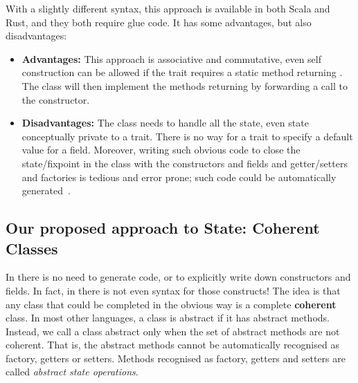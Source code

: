 \noindent 

With a slightly different syntax, this approach is available in both Scala and Rust, and they both require glue code.
It has some advantages, but also disadvantages: 

\begin{itemize}

\item {\bf Advantages:} This approach is associative and commutative, even self construction
  can be allowed if the trait requires a static method
  returning \Q@This@. The class will then implement the methods returning \Q@This@
  by forwarding a call to the constructor.
  
\item {\bf Disadvantages:}
The class needs to handle all the state, even state conceptually
   private to a trait. 
 There is no way for a trait to specify a default value for a field.
 Moreover, writing such obvious code to close
  the state/fixpoint in the class 
   with the constructors and fields and getter/setters and factories is tedious and error prone; such code could be automatically
   generated~\cite{wang2016classless}.
\end{itemize}

\subsection{Our proposed approach to State: Coherent Classes}

In \name there is no need to generate
code, or to explicitly write down constructors and fields. In fact, in
\name there is not even syntax for those constructs!  The idea is that
any class that could be completed in the obvious way  is a
  complete \textbf{coherent} class.  In most other languages, a class is
abstract if it has abstract methods.  Instead, we call a class
abstract only when the set of abstract methods are not coherent. That
is, the abstract methods cannot be automatically recognised
as factory, getters or setters. Methods recognised as factory, getters and setters are called
\emph{abstract state operations}.
  
